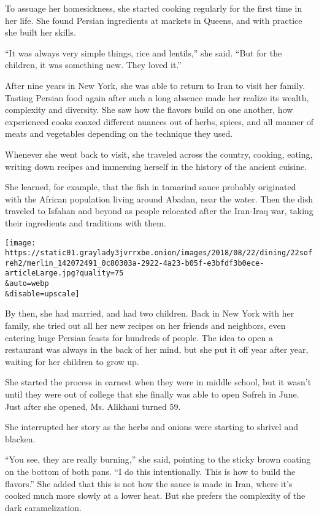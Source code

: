 To assuage her homesickness, she started cooking regularly for the first
time in her life. She found Persian ingredients at markets in Queens,
and with practice she built her skills.

``It was always very simple things, rice and lentils,'' she said. ``But
for the children, it was something new. They loved it.''

After nine years in New York, she was able to return to Iran to visit
her family. Tasting Persian food again after such a long absence made
her realize its wealth, complexity and diversity. She saw how the
flavors build on one another, how experienced cooks coaxed different
nuances out of herbs, spices, and all manner of meats and vegetables
depending on the technique they used.

Whenever she went back to visit, she traveled across the country,
cooking, eating, writing down recipes and immersing herself in the
history of the ancient cuisine.

She learned, for example, that the fish in tamarind sauce probably
originated with the African population living around Abadan, near the
water. Then the dish traveled to Isfahan and beyond as people relocated
after the Iran-Iraq war, taking their ingredients and traditions with
them.

\texttt{[image: https://static01.graylady3jvrrxbe.onion/images/2018/08/22/dining/22sofreh2/merlin\_142072491\_0c80303a-2922-4a23-b05f-e3bfdf3b0ece-articleLarge.jpg?quality=75\\\&auto=webp\\\&disable=upscale]}

By then, she had married, and had two children. Back in New York with
her family, she tried out all her new recipes on her friends and
neighbors, even catering huge Persian feasts for hundreds of people. The
idea to open a restaurant was always in the back of her mind, but she
put it off year after year, waiting for her children to grow up.

She started the process in earnest when they were in middle school, but
it wasn't until they were out of college that she finally was able to
open Sofreh in June. Just after she opened, Ms. Alikhani turned 59.

She interrupted her story as the herbs and onions were starting to
shrivel and blacken.

``You see, they are really burning,'' she said, pointing to the sticky
brown coating on the bottom of both pans. ``I do this intentionally.
This is how to build the flavors.'' She added that this is not how the
sauce is made in Iran, where it's cooked much more slowly at a lower
heat. But she prefers the complexity of the dark caramelization.

